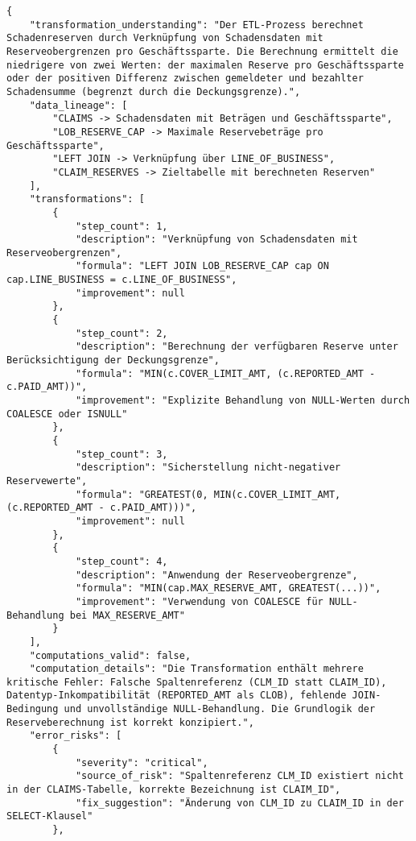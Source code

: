 \begin{lstlisting}[caption={Ausgabe: Claude Sonnet 4 Anwendungsfall 10 Robustheitsdurchlauf},label={claude_case10_prompt3}]
{
    "transformation_understanding": "Der ETL-Prozess berechnet Schadenreserven durch Verknüpfung von Schadensdaten mit Reserveobergrenzen pro Geschäftssparte. Die Berechnung ermittelt die niedrigere von zwei Werten: der maximalen Reserve pro Geschäftssparte oder der positiven Differenz zwischen gemeldeter und bezahlter Schadensumme (begrenzt durch die Deckungsgrenze).",
    "data_lineage": [
        "CLAIMS -> Schadensdaten mit Beträgen und Geschäftssparte",
        "LOB_RESERVE_CAP -> Maximale Reservebeträge pro Geschäftssparte",
        "LEFT JOIN -> Verknüpfung über LINE_OF_BUSINESS",
        "CLAIM_RESERVES -> Zieltabelle mit berechneten Reserven"
    ],
    "transformations": [
        {
            "step_count": 1,
            "description": "Verknüpfung von Schadensdaten mit Reserveobergrenzen",
            "formula": "LEFT JOIN LOB_RESERVE_CAP cap ON cap.LINE_BUSINESS = c.LINE_OF_BUSINESS",
            "improvement": null
        },
        {
            "step_count": 2,
            "description": "Berechnung der verfügbaren Reserve unter Berücksichtigung der Deckungsgrenze",
            "formula": "MIN(c.COVER_LIMIT_AMT, (c.REPORTED_AMT - c.PAID_AMT))",
            "improvement": "Explizite Behandlung von NULL-Werten durch COALESCE oder ISNULL"
        },
        {
            "step_count": 3,
            "description": "Sicherstellung nicht-negativer Reservewerte",
            "formula": "GREATEST(0, MIN(c.COVER_LIMIT_AMT, (c.REPORTED_AMT - c.PAID_AMT)))",
            "improvement": null
        },
        {
            "step_count": 4,
            "description": "Anwendung der Reserveobergrenze",
            "formula": "MIN(cap.MAX_RESERVE_AMT, GREATEST(...))",
            "improvement": "Verwendung von COALESCE für NULL-Behandlung bei MAX_RESERVE_AMT"
        }
    ],
    "computations_valid": false,
    "computation_details": "Die Transformation enthält mehrere kritische Fehler: Falsche Spaltenreferenz (CLM_ID statt CLAIM_ID), Datentyp-Inkompatibilität (REPORTED_AMT als CLOB), fehlende JOIN-Bedingung und unvollständige NULL-Behandlung. Die Grundlogik der Reserveberechnung ist korrekt konzipiert.",
    "error_risks": [
        {
            "severity": "critical",
            "source_of_risk": "Spaltenreferenz CLM_ID existiert nicht in der CLAIMS-Tabelle, korrekte Bezeichnung ist CLAIM_ID",
            "fix_suggestion": "Änderung von CLM_ID zu CLAIM_ID in der SELECT-Klausel"
        },

\end{lstlisting}
